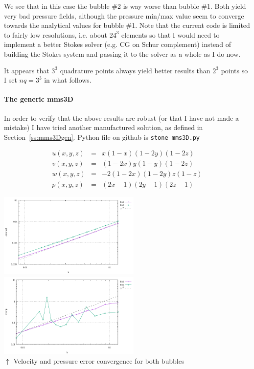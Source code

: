 We see that in this case the bubble \#2 is way worse than bubble \#1. Both 
yield very bad pressure fields, although the pressure min/max value seem to converge 
towards the analytical values for bubble \#1. 
Note that the current code is limited to fairly low resolutions, i.e. about $24^3$ elements so that
I would need to implement a better Stokes solver (e.g. CG on Schur complement) instead 
of building the Stokes system and passing it to the solver as a whole as I do now. %

It appears that $3^3$ quadrature points always yield better results than $2^3$ points
so I set $nq=3^3$ in what follows.

\paragraph{The generic mms3D} In order to verify that 
the above results are robust (or that I have not made a mistake)
I have tried another manufactured solution, as defined in Section~\ref{ss:mms3Dgen}. 
Python file on github is {\tt stone\_mms3D.py}

\begin{eqnarray}
u(x,y,z) &=& x(1-x)(1-2y)(1-2z)\\
v(x,y,z) &=& (1-2x) y(1-y) (1-2z) \\
w(x,y,z) &=& -2(1-2x)(1-2y)z(1-z) \\
p(x,y,z) &=& (2x-1)(2y-1)(2z-1)
\end{eqnarray}

\begin{center}
\includegraphics[width=7cm]{python_codes/fieldstone_75/results/mms3D/errors_v.pdf}
\includegraphics[width=7cm]{python_codes/fieldstone_75/results/mms3D/errors_p.pdf}\\
{\captionfont $\uparrow$ Velocity and pressure error convergence for both bubbles}
\end{center}

